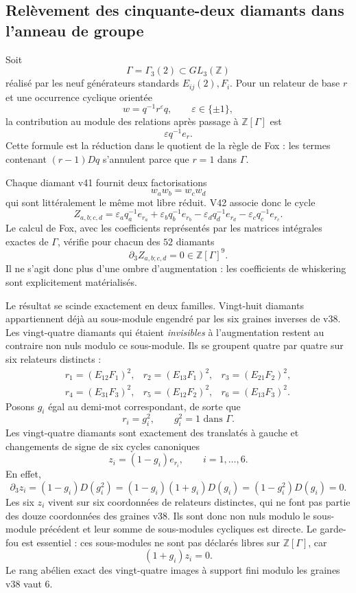 \documentclass[11pt,a4paper]{article}
\begin{document}
\subsection{Relèvement des cinquante-deux diamants dans l'anneau de groupe}

Soit
\[
 \Gamma=\Gamma_3(2)\subset GL_3(\mathbb Z)
\]
réalisé par les neuf générateurs standards $E_{ij}(2),F_i$. Pour un relateur de base $r$ et une occurrence cyclique orientée
\[
 w=q^{-1}r^{\varepsilon}q,
 \qquad \varepsilon\in\{\pm1\},
\]
la contribution au module des relations après passage à $\mathbb Z[\Gamma]$ est
\[
 \varepsilon q^{-1}e_r.
\]
Cette formule est la réduction dans le quotient de la règle de Fox : les termes contenant $(r-1)Dq$ s'annulent parce que $r=1$ dans $\Gamma$.

Chaque diamant v41 fournit deux factorisations
\[
 w_aw_b=w_cw_d
\]
qui sont littéralement le même mot libre réduit. V42 associe donc le cycle
\[
 Z_{a,b;c,d}
 =\varepsilon_aq_a^{-1}e_{r_a}
 +\varepsilon_bq_b^{-1}e_{r_b}
 -\varepsilon_dq_d^{-1}e_{r_d}
 -\varepsilon_cq_c^{-1}e_{r_c}.
\]
Le calcul de Fox, avec les coefficients représentés par les matrices intégrales exactes de $\Gamma$, vérifie pour chacun des $52$ diamants
\[
 \boxed{\partial_3Z_{a,b;c,d}=0\in\mathbb Z[\Gamma]^9.}
\]
Il ne s'agit donc plus d'une ombre d'augmentation : les coefficients de whiskering sont explicitement matérialisés.

Le résultat se scinde exactement en deux familles. Vingt-huit diamants appartiennent déjà au sous-module engendré par les six graines inverses de v38. Les vingt-quatre diamants qui étaient \emph{invisibles} à l'augmentation restent au contraire non nuls modulo ce sous-module. Ils se groupent quatre par quatre sur six relateurs distincts :
\[
\begin{array}{lll}
 r_1=(E_{12}F_1)^2,&
 r_2=(E_{13}F_1)^2,&
 r_3=(E_{21}F_2)^2,\\
 r_4=(E_{31}F_3)^2,&
 r_5=(E_{12}F_2)^2,&
 r_6=(E_{13}F_3)^2.
\end{array}
\]
Posons $g_i$ égal au demi-mot correspondant, de sorte que
\[
 \boxed{r_i=g_i^2,\qquad g_i^2=1\text{ dans }\Gamma.}
\]
Les vingt-quatre diamants sont exactement des translatés à gauche et changements de signe de six cycles canoniques
\[
 \boxed{z_i=(1-g_i)e_{r_i},\qquad i=1,\ldots,6.}
\]
En effet,
\[
 \partial_3z_i=(1-g_i)D(g_i^2)
 =(1-g_i)(1+g_i)D(g_i)
 =(1-g_i^2)D(g_i)=0.
\]
Les six $z_i$ vivent sur six coordonnées de relateurs distinctes, qui ne font pas partie des douze coordonnées des graines v38. Ils sont donc non nuls modulo le sous-module précédent et leur somme de sous-modules cycliques est directe. Le garde-fou est essentiel : ces sous-modules ne sont pas déclarés libres sur $\mathbb Z[\Gamma]$, car
\[
 \boxed{(1+g_i)z_i=0.}
\]
Le rang abélien exact des vingt-quatre images à support fini modulo les graines v38 vaut $6$.
\end{document}
